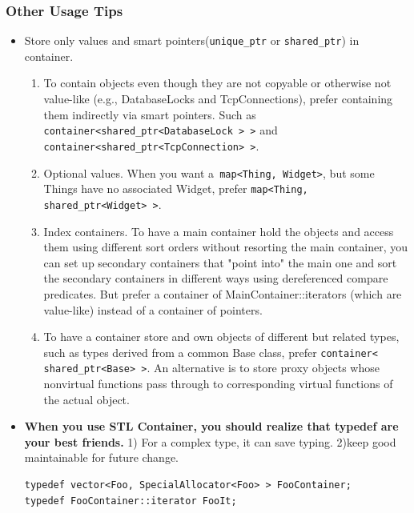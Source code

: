 \documentclass[a4paper,11pt,twoside]{book}
\begin{document}
\subsubsection{Other Usage Tips}
\begin{itemize}
		
	\item Store only values and smart pointers(\texttt{unique\_ptr} or \texttt{shared\_ptr}) in container.

\begin{enumerate}
	\item To contain objects even though they are not copyable or otherwise not value-like (e.g., DatabaseLocks and
	TcpConnections), prefer containing them indirectly via smart pointers. Such as
	\texttt{container<shared\_ptr<DatabaseLock > >} and \\
	\texttt{container<shared\_ptr<TcpConnection> >}.
	
	\item Optional values. When you want a\texttt{ map<Thing, Widget>}, but some Things have no associated Widget, prefer \texttt{map<Thing, shared\_ptr<Widget> >}.
	
	\item Index containers. To have a main container hold the objects and access them using different sort orders without resorting the main container, you can set up secondary containers that "point into" the main one and sort the secondary containers in different ways using dereferenced compare predicates. But prefer a container of MainContainer::iterators (which are value-like) instead of a container of pointers.
	
	\item To have a container store and own objects of different but related types, such as types derived from a common Base class, prefer \texttt{container< shared\_ptr<Base> >}. An alternative is to store proxy objects whose nonvirtual functions pass through to corresponding virtual functions of the actual object.
\end{enumerate}



\item \textbf{When you use STL Container, you should realize that typedef are your best friends.} 1) For a complex type, it can save typing. 2)keep good maintainable for future change. 
\begin{lstlisting}[numbers=none]
typedef vector<Foo, SpecialAllocator<Foo> > FooContainer;
typedef FooContainer::iterator FooIt;


\end{lstlisting}
\end{itemize}
\end{document}
